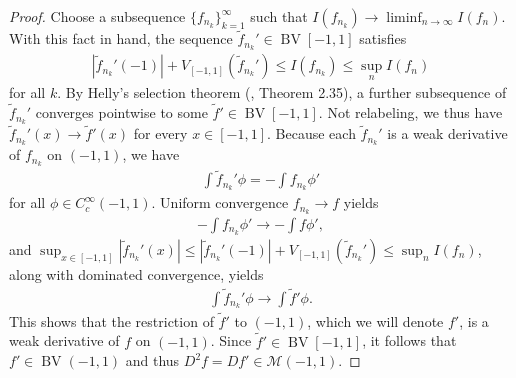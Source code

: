 \documentclass{article}
\DeclareMathOperator{\BV}{BV}
\def\cM{{\mathcal{M}}}
\begin{document}
\begin{appendices}
\begin{proof}
    Choose a subsequence $\{ f_{n_k} \}_{k=1}^\infty$ such that $I(f_{n_k}) \to \liminf_{n \to \infty} I(f_n)$. With this fact in hand, the sequence $\tilde{f}_{n_k}' \in \BV[-1,1]$ satisfies
    \begin{align}
        |\tilde{f}_{n_k}'(-1)| + V_{[-1,1]}(\tilde{f}_{n_k}') \leq I(f_{n_k}) \leq \sup_n I(f_n)
    \end{align} 
    for all $k$. By Helly's selection theorem (\cite{leoni2017first}, Theorem 2.35), a further subsequence of $\tilde{f}_{n_k}'$ converges pointwise to some $\tilde{f}' \in \BV[-1,1]$. Not relabeling, we thus have $\tilde{f}_{n_k}'(x) \to \tilde{f}'(x)$ for every $x \in [-1,1]$. Because each $\tilde{f}_{n_k}'$ is a weak derivative of $f_{n_k}$ on $(-1,1)$, we have
    \begin{align}
        \int \tilde{f}_{n_k}' \phi = -\int f_{n_k} \phi'
    \end{align}
    for all $\phi \in C_c^\infty(-1,1)$. Uniform convergence $f_{n_k} \to f$ yields
    \begin{align}
        - \int f_{n_k} \phi' \to - \int f \phi',
    \end{align}
    and $\sup_{x \in [-1,1]} |\tilde{f}_{n_k}'(x)| \leq |\tilde{f}_{n_k}'(-1)| + V_{[-1,1]} (\tilde{f}_{n_k}') \leq \sup_n I(f_n)$, along with dominated convergence, yields
    \begin{align}
        \int \tilde{f}_{n_k}' \phi \to \int \tilde{f}' \phi.
    \end{align}
    This shows that the restriction of $\tilde{f}'$ to $(-1,1)$, which we will denote $f'$, is a weak derivative of $f$ on $(-1,1)$. Since $\tilde{f}' \in \BV[-1,1]$, it follows that $f' \in \BV(-1,1)$ and thus $D^2 f = Df' \in \cM(-1,1)$. 


\end{proof}
\end{appendices}
\end{document}

